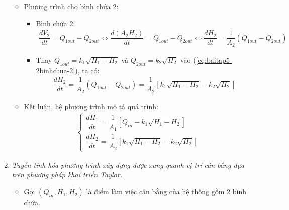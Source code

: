 \begin{enumerate}[\it a.]
\begin{itemize}
                    \item Phương trình cho bình chứa 2:
                        \begin{itemize}
                            \item Bình chứa 2:
                                \begin{align} \label{eq:baitap5-2binhchua-2}
                                    \dfrac{dV_2}{dt} = Q_{1out} - Q_{2out} \Longleftrightarrow \dfrac{d\left({A_2 H_2}\right)}{dt} = Q_{1out} - Q_{2out} \Longleftrightarrow \dfrac{dH_2}{dt} = \dfrac{1}{A_2} \left({Q_{1out} - Q_{2out}}\right)
                                \end{align}

                            \item Thay $Q_{1out} = k_1 \sqrt{H_1 - H_2}$ và $Q_{2out} = k_2 \sqrt{H_2}$ vào (\ref{eq:baitap5-2binhchua-2}), ta có:
                                \begin{align}
                                    \dfrac{dH_2}{dt} = \dfrac{1}{A_2} \left({Q_{1out} - Q_{2out}}\right) = \dfrac{1}{A_2} \left[{k_1 \sqrt{H_1 - H_2} - k_2 \sqrt{H_2}}\right]
                                \end{align}
                        \end{itemize}

                    \item Kết luận, hệ phương trình mô tả quá trình:
                        \begin{align}
                            \left\{
                            \begin{array}{l}
                                \dfrac{dH_1}{dt} = \dfrac{1}{A_1} \left[{Q_{in} - k_1 \sqrt{H_1 - H_2}}\right]\\ [.5cm]
                                \dfrac{dH_2}{dt} = \dfrac{1}{A_2} \left[{k_1 \sqrt{H_1 - H_2} - k_2 \sqrt{H_2}}\right]
                            \end{array}
                            \right.
                        \end{align}
                \end{itemize}

            \item \textit{Tuyến tính hóa phương trình xây dựng được xung quanh vị trí cân bằng dựa trên phương pháp khai triển Taylor.}
                \begin{itemize}
                    \item Gọi $\left({\overline{Q_{in}}, \overline{H_1}, \overline{H_2}}\right)$ là điểm làm việc cân bằng của hệ thống gồm 2 bình chứa.


\end{itemize}
\end{enumerate}
